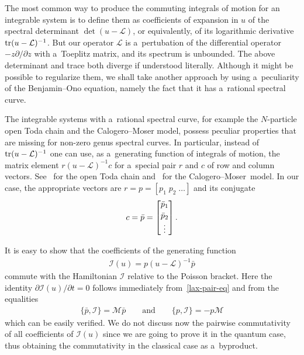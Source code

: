 \documentclass[pdftex]{sigma}
\numberwithin{equation}{section}
\newcommand{\tr}{\mathop{\hbox{\rm tr}}\nolimits}
\begin{document}
The most common way to produce the commuting integrals of motion for an integrable system is to def\/ine
them as coef\/f\/icients of expansion in $u$ of the spectral determinant $\det(u-\mathcal
L)$, or equivalently, of its logarithmic derivative $\tr(u-\mathcal L)^{-1}$.
But our operator $\mathcal L$ is a~pertubation of the dif\/ferential operator
$-z\partial /\partial  z$ with a~Toeplitz matrix, and its spectrum is unbounded.
The above determinant and trace both diverge if understood literally.
Although it might be possible to regularize them, we shall take another approach by using a~peculiarity of
the Benjamin--Ono equation, namely the fact that it has a~rational spectral curve.

The integrable systems with a~rational spectral curve, for example the $N$-particle open Toda chain and the
Calogero--Moser model, possess peculiar properties that are missing for non-zero genus
spectral curves.
In particular, instead of $\tr(u-\mathcal
L)^{-1}$ one can use, as a~generating function of integrals of motion, the matrix element $r(u-\mathcal
L)^{-1} c$ for a~special pair $r$ and $c$ of row and column vectors.
See~\cite{KV,Skl,Ta} for the open Toda chain and~\cite{Ta,Va} for the Calogero--Moser~model.
In our case, the appropriate vectors are $r=p=[p_1\; p_2\; \ldots]$ and its conjugate
\begin{gather*}
c=\bar{p}=
\begin{bmatrix}
\bar{p}_1
\\[2pt]
\bar{p}_2
\\[6pt]
\raisebox{0pt}[0pt][2pt]{\vdots}
\end{bmatrix}
.
\end{gather*}

It is easy to show that the coef\/f\/icients of the generating function
\begin{gather}
\label{I(u)cl}
\mathcal I(u)=p(u-\mathcal L)^{-1}\bar{p}
\end{gather}
commute with the Hamiltonian $\mathcal I$ relative to the Poisson bracket.
Here the identity $\partial \mathcal I(u)/\partial  t=0$ follows immediately
from~\eqref{lax-pair-eq} and from the equalities
\begin{gather*}
\{\bar{p},\mathcal I\}=\mathcal M\bar{p}
\qquad
\text{and}
\qquad
\{p,\mathcal I\}=-p\mathcal M
\end{gather*}
which can be easily verif\/ied.
We do not discuss now the pairwise commutativity of all coef\/f\/icients of $\mathcal I(u)$ since we are
going to prove it in the quantum case, thus obtaining the commutativity in the classical case as
a~byproduct.
\end{document}
